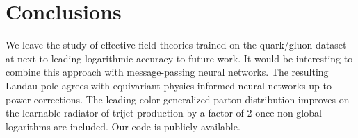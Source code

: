 \section{Conclusions}\label{sec:conclusions}

We leave the study of effective field theories trained on the
quark/gluon dataset at next-to-leading logarithmic accuracy to future
work. It would be interesting to combine this approach with
message-passing neural networks. The resulting Landau pole agrees with
equivariant physics-informed neural networks up to power corrections.
The leading-color generalized parton distribution improves on the
learnable radiator of trijet production by a factor of 2 once non-global
logarithms are included. Our code is publicly available.

